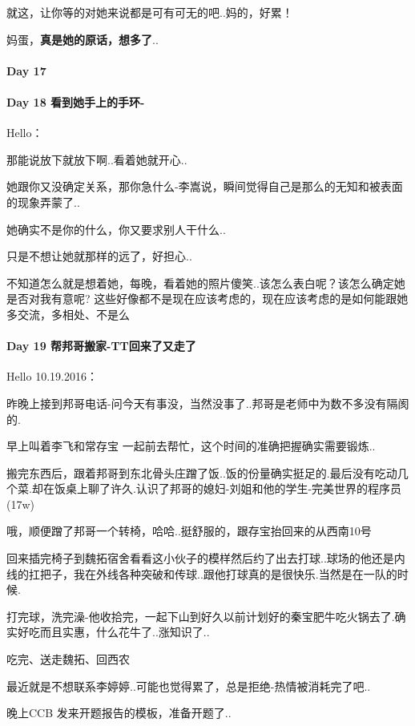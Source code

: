\documentclass[UTF8,a4paper,8pt]{ctexbook}
\begin{document}
	 	 就这，让你等的对她来说都是可有可无的吧..妈的，好累！
	 	 
	 	 妈蛋，\textbf{真是她的原话，想多了}..
 	 \paragraph{Day 17      \quad     }
 	 \paragraph{Day 18  看到她手上的手环-  \quad     }
	 	 Hello：
	 	 
	 	 那能说放下就放下啊..看着她就开心..
	 	 
	 	 她跟你又没确定关系，那你急什么-李嵩说，瞬间觉得自己是那么的无知和被表面的现象弄蒙了..
	 	 
	 	 她确实不是你的什么，你又要求别人干什么..
	 	 
	 	 只是不想让她就那样的远了，好担心..
	 	 
	 	 不知道怎么就是想着她，每晚，看着她的照片傻笑..该怎么表白呢？该怎么确定她是否对我有意呢? 这些好像都不是现在应该考虑的，现在应该考虑的是如何能跟她多交流，多相处、不是么
 	 \paragraph{Day 19   帮邦哥搬家-TT回来了又走了   \quad     }
	 	 Hello 10.19.2016：
	 	 
		 昨晚上接到邦哥电话-问今天有事没，当然没事了..邦哥是老师中为数不多没有隔阂的.
		 
		 早上叫着李飞和常存宝 一起前去帮忙，这个时间的准确把握确实需要锻炼..
		 
		 搬完东西后，跟着邦哥到东北骨头庄蹭了饭..饭的份量确实挺足的.最后没有吃动几个菜.却在饭桌上聊了许久.认识了邦哥的媳妇-刘姐和他的学生-完美世界的程序员(17w)
		 
		 哦，顺便蹭了邦哥一个转椅，哈哈..挺舒服的，跟存宝抬回来的从西南10号
		 
		 回来插完椅子到魏拓宿舍看看这小伙子的模样然后约了出去打球..球场的他还是内线的扛把子，我在外线各种突破和传球..跟他打球真的是很快乐.当然是在一队的时候.
		 
		 打完球，洗完澡-他收拾完，一起下山到好久以前计划好的秦宝肥牛吃火锅去了.确实好吃而且实惠，什么花牛了..涨知识了..
		 
		 吃完、送走魏拓、回西农
		 
		 最近就是不想联系李婷婷..可能也觉得累了，总是拒绝-热情被消耗完了吧..
		 
		 晚上CCB 发来开题报告的模板，准备开题了..
\end{document}
